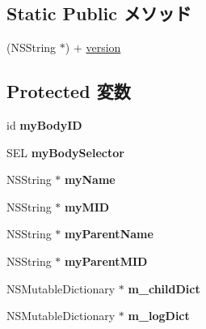 \subsection*{Static Public メソッド}
\begin{DoxyCompactItemize}
\item 
(NSString $\ast$) + \hyperlink{interface_messenger_system_aebad51a1ea3a010f1bb20d2f3327adcc}{version}
\end{DoxyCompactItemize}
\subsection*{Protected 変数}
\begin{DoxyCompactItemize}
\item 
\hypertarget{interface_messenger_system_a90f9745297d9d34f403579d395744a71}{
id {\bfseries myBodyID}}
\label{dc/dc9/interface_messenger_system_a90f9745297d9d34f403579d395744a71}

\item 
\hypertarget{interface_messenger_system_a469a5e545f12673594bc0117c8441068}{
SEL {\bfseries myBodySelector}}
\label{dc/dc9/interface_messenger_system_a469a5e545f12673594bc0117c8441068}

\item 
\hypertarget{interface_messenger_system_aa6f745c063b7432f33409c4e74fad099}{
NSString $\ast$ {\bfseries myName}}
\label{dc/dc9/interface_messenger_system_aa6f745c063b7432f33409c4e74fad099}

\item 
\hypertarget{interface_messenger_system_ab0873dccec01721962a9feda60f881e9}{
NSString $\ast$ {\bfseries myMID}}
\label{dc/dc9/interface_messenger_system_ab0873dccec01721962a9feda60f881e9}

\item 
\hypertarget{interface_messenger_system_a768d13ac0ab2689e095bcae527cb3c1b}{
NSString $\ast$ {\bfseries myParentName}}
\label{dc/dc9/interface_messenger_system_a768d13ac0ab2689e095bcae527cb3c1b}

\item 
\hypertarget{interface_messenger_system_a160a088edbe00c0a701b5c51a36203d3}{
NSString $\ast$ {\bfseries myParentMID}}
\label{dc/dc9/interface_messenger_system_a160a088edbe00c0a701b5c51a36203d3}

\item 
\hypertarget{interface_messenger_system_a7596fd096f620d0141fac502665dcabf}{
NSMutableDictionary $\ast$ {\bfseries m\_\-childDict}}
\label{dc/dc9/interface_messenger_system_a7596fd096f620d0141fac502665dcabf}

\item 
\hypertarget{interface_messenger_system_adf17d60a0ff5e2c21cb2f3717d9b5b55}{
NSMutableDictionary $\ast$ {\bfseries m\_\-logDict}}
\label{dc/dc9/interface_messenger_system_adf17d60a0ff5e2c21cb2f3717d9b5b55}

\end{DoxyCompactItemize}


